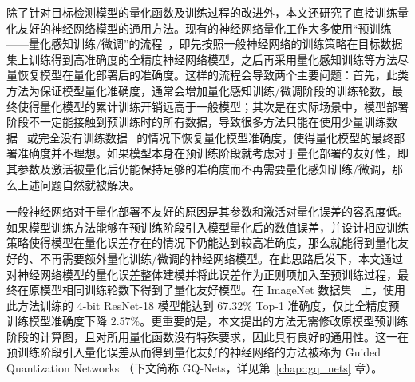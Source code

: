 \documentclass[
  fontset = mac,
]{shtthesis}
\begin{document}
除了针对目标检测模型的量化函数及训练过程的改进外，本文还研究了直接训练量化友好的神经网络模型的通用方法。现有的神经网络量化工作大多使用“预训练——量化感知训练/微调”的流程~\citep{jacob2018quantization, krishnamoorthi2018quantizing, jung2019learning, li2019additive}，即先按照一般神经网络的训练策略在目标数据集上训练得到高准确度的全精度神经网络模型，之后再采用量化感知训练等方法尽量恢复模型在量化部署后的准确度。这样的流程会导致两个主要问题：首先，此类方法为保证模型量化准确度，通常会增加量化感知训练/微调阶段的训练轮数，最终使得量化模型的累计训练开销远高于一般模型；其次是在实际场景中，模型部署阶段不一定能接触到预训练时的所有数据，导致很多方法只能在使用少量训练数据~\citep{he2018learning} 或完全没有训练数据~\citep{nagel2019data, meller2019same} 的情况下恢复量化模型准确度，使得量化模型的最终部署准确度并不理想。如果模型本身在预训练阶段就考虑对于量化部署的友好性，即其参数及激活被量化后仍能保持足够的准确度而不再需要量化感知训练/微调，那么上述问题自然就被解决。

一般神经网络对于量化部署不友好的原因是其参数和激活对量化误差的容忍度低。如果模型训练方法能够在预训练阶段引入模型量化后的数值误差，并设计相应训练策略使得模型在量化误差存在的情况下仍能达到较高准确度，那么就能得到量化友好的、不再需要额外量化训练/微调的神经网络模型。在此思路启发下，本文通过对神经网络模型的量化误差整体建模并将此误差作为正则项加入至预训练过程，最终在原模型相同训练轮数下得到了量化友好模型。在 ImageNet 数据集~\citep{ILSVRC15} 上，使用此方法训练的 4-bit ResNet-18 模型能达到 $67.32\%$ Top-1 准确度，仅比全精度预训练模型准确度下降 $2.57\%$。更重要的是，本文提出的方法无需修改原模型预训练阶段的计算图，且对所用量化函数没有特殊要求，因此具有良好的通用性。这一在预训练阶段引入量化误差从而得到量化友好的神经网络的方法被称为 Guided Quantization Networks （下文简称 GQ-Nets，详见第~\ref{chap::gq_nets} 章）。
\end{document}
